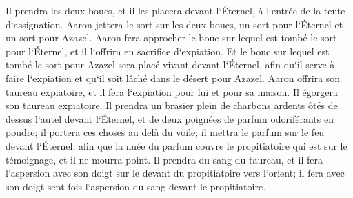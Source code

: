 \verse Il prendra les deux boucs, et il les placera devant l`Éternel, à l`entrée de la tente d`assignation. 
\verse Aaron jettera le sort sur les deux boucs, un sort pour l`Éternel et un sort pour Azazel. 
\verse Aaron fera approcher le bouc sur lequel est tombé le sort pour l`Éternel, et il l`offrira en sacrifice d`expiation. 
\verse Et le bouc sur lequel est tombé le sort pour Azazel sera placé vivant devant l`Éternel, afin qu`il serve à faire l`expiation et qu`il soit lâché dans le désert pour Azazel. 
\verse Aaron offrira son taureau expiatoire, et il fera l`expiation pour lui et pour sa maison. Il égorgera son taureau expiatoire. 
\verse Il prendra un brasier plein de charbons ardents ôtés de dessus l`autel devant l`Éternel, et de deux poignées de parfum odoriférants en poudre; il portera ces choses au delà du voile; 
\verse il mettra le parfum sur le feu devant l`Éternel, afin que la nuée du parfum couvre le propitiatoire qui est sur le témoignage, et il ne mourra point. 
\verse Il prendra du sang du taureau, et il fera l`aspersion avec son doigt sur le devant du propitiatoire vers l`orient; il fera avec son doigt sept fois l`aspersion du sang devant le propitiatoire. 
